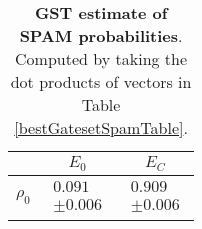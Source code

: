 \documentclass{article}[11pt]
\begin{document}
\begin{table}[h]
\begin{center}
\begin{tabular}[l]{|c|c|c|}
\hline
 & $E_{0}$ & $E_C$ \\ \hline
$\rho_{0}$ & $ \begin{array}{c} 0.091 \\ \pm 0.006 \end{array} $ & $ \begin{array}{c} 0.909 \\ \pm 0.006 \end{array} $ \\ \hline
\end{tabular}

\caption{\textbf{GST estimate of SPAM probabilities}.  Computed by taking the dot products of vectors in Table \ref{bestGatesetSpamTable}.\label{bestGatesetSpamParametersTable}}
\end{center}
\end{table}
\end{document}
